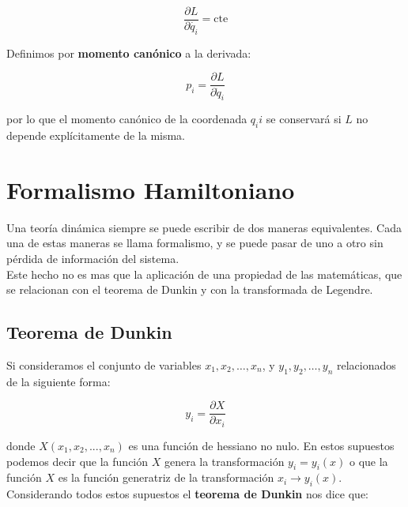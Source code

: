 \documentclass[12pt,a4paper]{book}
\newcommand{\parciales}[2]{\frac{\partial #1}{\partial #2}}
\begin{document}
$$ \parciales{L}{\dot{q_i}} = \mathrm{cte} $$

Definimos por \textbf{momento canónico} a la derivada:

\begin{equation}
p_i = \parciales{L}{\dot{q}_i}
\end{equation}

por lo que el momento canónico de la coordenada $q_ii$ se conservará si $L$ no depende explícitamente de la misma.

\section{Formalismo Hamiltoniano}

Una teoría dinámica siempre se puede escribir de dos maneras equivalentes. Cada una de estas maneras se llama formalismo, y se puede pasar de uno a otro sin pérdida de información del sistema. \\

Este hecho no es mas que la aplicación de una propiedad de las matemáticas, que se relacionan con el teorema de Dunkin y con la transformada de Legendre.

\subsection{Teorema de Dunkin}

Si consideramos el conjunto de variables $x_1,x_2,\ldots,x_n$, y $y_1,y_2,\ldots,y_n$ relacionados de la siguiente forma:

\begin{equation}
y_i = \parciales{X}{x_i}
\end{equation}

donde $X(x_1,x_2,...,x_n)$ es una función de hessiano no nulo. En estos supuestos podemos decir que la función $X$ genera la transformación $y_i = y_i (x)$ o que la función $X$ es la función generatriz de la transformación $x_i \rightarrow y_i (x)$. Considerando todos estos supuestos el \textbf{teorema de Dunkin} nos dice que:
\end{document}

